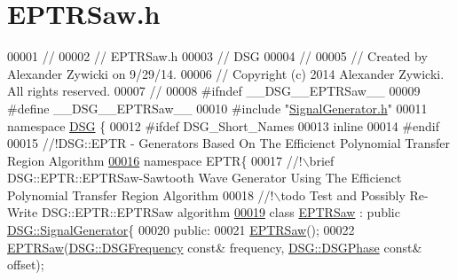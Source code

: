 \hypertarget{_e_p_t_r_saw_8h_source}{\section{E\+P\+T\+R\+Saw.\+h}
\label{_e_p_t_r_saw_8h_source}
}

\begin{DoxyCode}
00001 \textcolor{comment}{//}
00002 \textcolor{comment}{//  EPTRSaw.h}
00003 \textcolor{comment}{//  DSG}
00004 \textcolor{comment}{//}
00005 \textcolor{comment}{//  Created by Alexander Zywicki on 9/29/14.}
00006 \textcolor{comment}{//  Copyright (c) 2014 Alexander Zywicki. All rights reserved.}
00007 \textcolor{comment}{//}
00008 \textcolor{preprocessor}{#ifndef \_\_DSG\_\_EPTRSaw\_\_}
00009 \textcolor{preprocessor}{#define \_\_DSG\_\_EPTRSaw\_\_}
00010 \textcolor{preprocessor}{#include "\hyperlink{_signal_generator_8h}{SignalGenerator.h}"}
00011 \textcolor{keyword}{namespace }\hyperlink{namespace_d_s_g}{DSG} \{
00012 \textcolor{preprocessor}{#ifdef DSG\_Short\_Names}
00013     \textcolor{keyword}{inline}
00014 \textcolor{preprocessor}{#endif}
00015 \textcolor{comment}{    //!DSG::EPTR - Generators Based On The Efficienct Polynomial Transfer Region Algorithm}
\hypertarget{_e_p_t_r_saw_8h_source_l00016}{}\hyperlink{namespace_d_s_g_1_1_e_p_t_r}{00016} \textcolor{comment}{}    \textcolor{keyword}{namespace }EPTR\{\textcolor{comment}{}
00017 \textcolor{comment}{        //!\(\backslash\)brief DSG::EPTR::EPTRSaw-Sawtooth Wave Generator Using The Efficienct Polynomial Transfer
       Region Algorithm}
00018 \textcolor{comment}{        //!\(\backslash\)todo Test and Possibly Re-Write DSG::EPTR::EPTRSaw algorithm }
\hypertarget{_e_p_t_r_saw_8h_source_l00019}{}\hyperlink{class_d_s_g_1_1_e_p_t_r_1_1_e_p_t_r_saw}{00019} \textcolor{comment}{}        \textcolor{keyword}{class }\hyperlink{class_d_s_g_1_1_e_p_t_r_1_1_e_p_t_r_saw}{EPTRSaw} : \textcolor{keyword}{public} \hyperlink{class_d_s_g_1_1_signal_generator}{DSG::SignalGenerator}\{
00020         \textcolor{keyword}{public}:
00021             \hyperlink{class_d_s_g_1_1_e_p_t_r_1_1_e_p_t_r_saw_a65c2009548fb7f946d48ea794c830501}{EPTRSaw}();
00022             \hyperlink{class_d_s_g_1_1_e_p_t_r_1_1_e_p_t_r_saw_a65c2009548fb7f946d48ea794c830501}{EPTRSaw}(\hyperlink{namespace_d_s_g_a4315a061386fa1014fda09b15d3a6973}{DSG::DSGFrequency} \textcolor{keyword}{const}& frequency,
      \hyperlink{namespace_d_s_g_a44431ce1eb0a7300efdd207bc879e52c}{DSG::DSGPhase} \textcolor{keyword}{const}& offset);

\end{DoxyCode}
